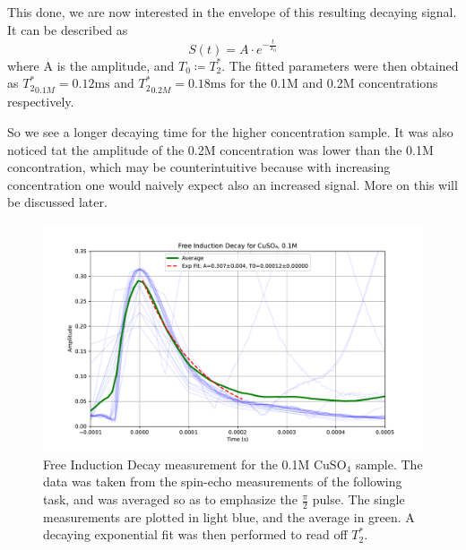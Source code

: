 \documentclass[12pt]{article}
\begin{document}
This done, we are now interested in the envelope of this resulting decaying signal. It can be described as  \[
	S(t) = A \cdot e^{-\frac{t}{T_0}}
\]
where A is the amplitude, and $T_0 \coloneq T_2^*$. The fitted parameters were then obtained as ${T_2^*}_{0.1M} = 0.12 \text{ms}$ and ${T_2^*}_{0.2M} = 0.18 \text{ms}$ for the 0.1M and 0.2M concentrations respectively.

So we see a longer decaying time for the higher concentration sample. It was also noticed tat the amplitude of the 0.2M concentration was lower than the 0.1M concontration, which may be counterintuitive because with increasing concentration one would naively expect also an increased signal. More on this will be discussed later.

\begin{figure}[H]
  \includegraphics[scale = 0.5]{Free_Induction_Decay_0.1M.pdf}
  \caption{Free Induction Decay measurement for the 0.1M $\text{CuSO}_4$ sample. The data was taken from the spin-echo measurements of the following task, and was averaged so as to emphasize the $\frac{\pi}{2}$ pulse. The single measurements are plotted in light blue, and the average in green. A decaying exponential fit was then performed to read off $T_2^*$.}
  \label{Free_Induction_Decay_0.1M.pdf}
\end{figure}
\end{document}
